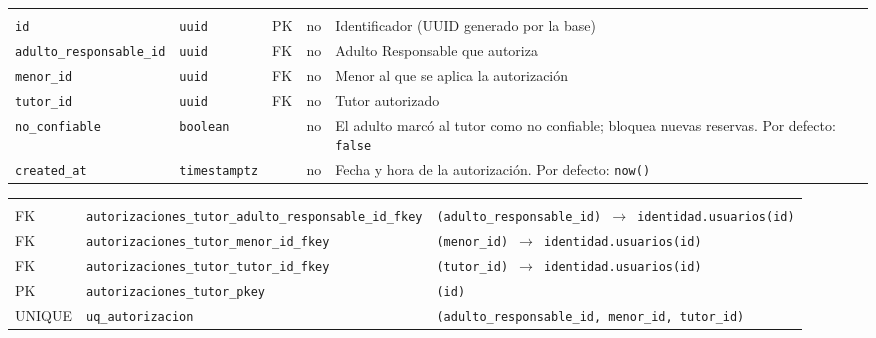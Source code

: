 {\small
\begin{xltabular}{\textwidth}{@{}>{\raggedright\arraybackslash}p{3.6cm} >{\raggedright\arraybackslash}p{2.3cm} >{\raggedright\arraybackslash}p{1cm} >{\centering\arraybackslash}p{0.85cm} L@{}}
    \toprule
     &  &  &  &  \\
    \midrule
    \endfirsthead
    \toprule
     &  &  &  &  \\
    \midrule
    \endhead
    \bottomrule
    \endfoot
    \texttt{id} & \texttt{uuid} & PK & no & Identificador (UUID generado por la base) \\
    \texttt{adulto\_\allowbreak{}responsable\_\allowbreak{}id} & \texttt{uuid} & FK & no & Adulto Responsable que autoriza \\
    \texttt{menor\_\allowbreak{}id} & \texttt{uuid} & FK & no & Menor al que se aplica la autorización \\
    \texttt{tutor\_\allowbreak{}id} & \texttt{uuid} & FK & no & Tutor autorizado \\
    \texttt{no\_\allowbreak{}confiable} & \texttt{boolean} &  & no & El adulto marcó al tutor como no confiable; bloquea nuevas reservas. Por defecto: \texttt{false} \\
    \texttt{created\_\allowbreak{}at} & \texttt{timestamptz} &  & no & Fecha y hora de la autorización. Por defecto: \texttt{now(\allowbreak{})} \\
\end{xltabular}
}

{\small
\begin{xltabular}{\textwidth}{@{}>{\raggedright\arraybackslash}p{1.7cm} >{\raggedright\arraybackslash}p{4.6cm} L@{}}
    \toprule
     &  &  \\
    \midrule
    \endfirsthead
    \toprule
     &  &  \\
    \midrule
    \endhead
    \bottomrule
    \endfoot
    FK & \texttt{autorizaciones\_\allowbreak{}tutor\_\allowbreak{}adulto\_\allowbreak{}responsable\_\allowbreak{}id\_\allowbreak{}fkey} & \texttt{(\allowbreak{}adulto\_\allowbreak{}responsable\_\allowbreak{}id) $\rightarrow$ identidad.usuarios(\allowbreak{}id)} \\
    FK & \texttt{autorizaciones\_\allowbreak{}tutor\_\allowbreak{}menor\_\allowbreak{}id\_\allowbreak{}fkey} & \texttt{(\allowbreak{}menor\_\allowbreak{}id) $\rightarrow$ identidad.usuarios(\allowbreak{}id)} \\
    FK & \texttt{autorizaciones\_\allowbreak{}tutor\_\allowbreak{}tutor\_\allowbreak{}id\_\allowbreak{}fkey} & \texttt{(\allowbreak{}tutor\_\allowbreak{}id) $\rightarrow$ identidad.usuarios(\allowbreak{}id)} \\
    PK & \texttt{autorizaciones\_\allowbreak{}tutor\_\allowbreak{}pkey} & \texttt{(\allowbreak{}id)} \\
    UNIQUE & \texttt{uq\_\allowbreak{}autorizacion} & \texttt{(\allowbreak{}adulto\_\allowbreak{}responsable\_\allowbreak{}id,\allowbreak{} menor\_\allowbreak{}id,\allowbreak{} tutor\_\allowbreak{}id)} \\
\end{xltabular}
}

